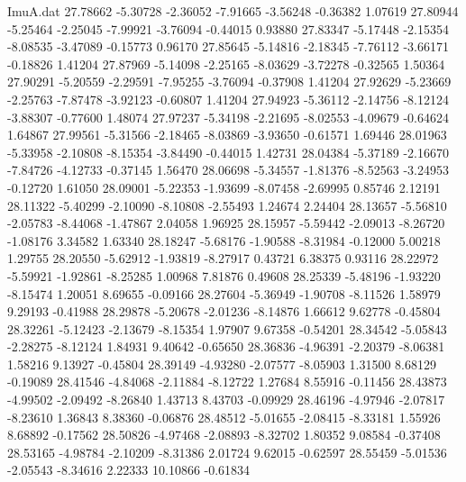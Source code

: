 \begin{filecontents}{ImuA.dat}
  27.78662   -5.30728   -2.36052   -7.91665   -3.56248   -0.36382    1.07619
  27.80944   -5.25464   -2.25045   -7.99921   -3.76094   -0.44015    0.93880
  27.83347   -5.17448   -2.15354   -8.08535   -3.47089   -0.15773    0.96170
  27.85645   -5.14816   -2.18345   -7.76112   -3.66171   -0.18826    1.41204
  27.87969   -5.14098   -2.25165   -8.03629   -3.72278   -0.32565    1.50364
  27.90291   -5.20559   -2.29591   -7.95255   -3.76094   -0.37908    1.41204
  27.92629   -5.23669   -2.25763   -7.87478   -3.92123   -0.60807    1.41204
  27.94923   -5.36112   -2.14756   -8.12124   -3.88307   -0.77600    1.48074
  27.97237   -5.34198   -2.21695   -8.02553   -4.09679   -0.64624    1.64867
  27.99561   -5.31566   -2.18465   -8.03869   -3.93650   -0.61571    1.69446
  28.01963   -5.33958   -2.10808   -8.15354   -3.84490   -0.44015    1.42731
  28.04384   -5.37189   -2.16670   -7.84726   -4.12733   -0.37145    1.56470
  28.06698   -5.34557   -1.81376   -8.52563   -3.24953   -0.12720    1.61050
  28.09001   -5.22353   -1.93699   -8.07458   -2.69995    0.85746    2.12191
  28.11322   -5.40299   -2.10090   -8.10808   -2.55493    1.24674    2.24404
  28.13657   -5.56810   -2.05783   -8.44068   -1.47867    2.04058    1.96925
  28.15957   -5.59442   -2.09013   -8.26720   -1.08176    3.34582    1.63340
  28.18247   -5.68176   -1.90588   -8.31984   -0.12000    5.00218    1.29755
  28.20550   -5.62912   -1.93819   -8.27917    0.43721    6.38375    0.93116
  28.22972   -5.59921   -1.92861   -8.25285    1.00968    7.81876    0.49608
  28.25339   -5.48196   -1.93220   -8.15474    1.20051    8.69655   -0.09166
  28.27604   -5.36949   -1.90708   -8.11526    1.58979    9.29193   -0.41988
  28.29878   -5.20678   -2.01236   -8.14876    1.66612    9.62778   -0.45804
  28.32261   -5.12423   -2.13679   -8.15354    1.97907    9.67358   -0.54201
  28.34542   -5.05843   -2.28275   -8.12124    1.84931    9.40642   -0.65650
  28.36836   -4.96391   -2.20379   -8.06381    1.58216    9.13927   -0.45804
  28.39149   -4.93280   -2.07577   -8.05903    1.31500    8.68129   -0.19089
  28.41546   -4.84068   -2.11884   -8.12722    1.27684    8.55916   -0.11456
  28.43873   -4.99502   -2.09492   -8.26840    1.43713    8.43703   -0.09929
  28.46196   -4.97946   -2.07817   -8.23610    1.36843    8.38360   -0.06876
  28.48512   -5.01655   -2.08415   -8.33181    1.55926    8.68892   -0.17562
  28.50826   -4.97468   -2.08893   -8.32702    1.80352    9.08584   -0.37408
  28.53165   -4.98784   -2.10209   -8.31386    2.01724    9.62015   -0.62597
  28.55459   -5.01536   -2.05543   -8.34616    2.22333   10.10866   -0.61834

\end{filecontents}
